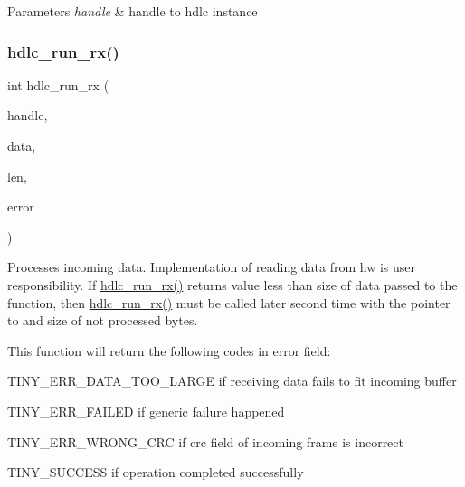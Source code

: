 \begin{DoxyParams}{Parameters}
{\em handle} & handle to hdlc instance \\
\hline
\end{DoxyParams}
\mbox{\label{group__HDLC__API_ga911a3f1cb32dd6cadd00223e0097642c}} 
\subsubsection{\texorpdfstring{hdlc\+\_\+run\+\_\+rx()}{hdlc\_run\_rx()}}
{\footnotesize\ttfamily int hdlc\+\_\+run\+\_\+rx (\begin{DoxyParamCaption}\item[{\hyperlink{group__HDLC__API_gabeaf7578aed5279d3af891bd85a9f961}{hdlc\+\_\+handle\+\_\+t}}]{handle,  }\item[{const void $\ast$}]{data,  }\item[{int}]{len,  }\item[{int $\ast$}]{error }\end{DoxyParamCaption})}

Processes incoming data. Implementation of reading data from hw is user responsibility. If \hyperlink{group__HDLC__API_ga911a3f1cb32dd6cadd00223e0097642c}{hdlc\+\_\+run\+\_\+rx()} returns value less than size of data passed to the function, then \hyperlink{group__HDLC__API_ga911a3f1cb32dd6cadd00223e0097642c}{hdlc\+\_\+run\+\_\+rx()} must be called later second time with the pointer to and size of not processed bytes.

This function will return the following codes in error field\+:
\begin{DoxyItemize}
\item T\+I\+N\+Y\+\_\+\+E\+R\+R\+\_\+\+D\+A\+T\+A\+\_\+\+T\+O\+O\+\_\+\+L\+A\+R\+GE if receiving data fails to fit incoming buffer
\item T\+I\+N\+Y\+\_\+\+E\+R\+R\+\_\+\+F\+A\+I\+L\+ED if generic failure happened
\item T\+I\+N\+Y\+\_\+\+E\+R\+R\+\_\+\+W\+R\+O\+N\+G\+\_\+\+C\+RC if crc field of incoming frame is incorrect
\item T\+I\+N\+Y\+\_\+\+S\+U\+C\+C\+E\+SS if operation completed successfully
\end{DoxyItemize}



